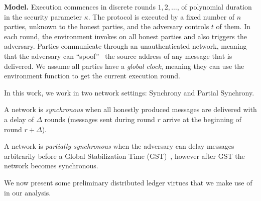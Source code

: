 \noindent
\textbf{Model.}
Execution commences in discrete rounds $1, 2, \ldots$, of polynomial duration in the
security parameter $\kappa$.
The protocol is executed by a fixed number of $n$ parties,
unknown to the honest parties, and the adversary controls $t$ of them. 
In each round, the environment invokes \execute
on all honest parties and also triggers the adversary.
Parties communicate through an unauthenticated network,
meaning that the adversary can ``spoof''~\cite{douceur2002sybil}
the source address of any message that is delivered.
We assume all parties have a \emph{global clock}, meaning
they can use the environment function \now to get the current
execution round.


In this work, we work in two network settings: Synchrony and Partial Synchrony.

\begin{definition}[Synchrony]
  A network is \emph{synchronous} when
  all honestly produced messages are delivered with a delay of $\Delta$ rounds
  (messages sent during round $r$ arrive at the beginning of round $r + \Delta$).
\end{definition}

\begin{definition}
  A network is \emph{partially synchronous} when the adversary can delay
  messages arbitrarily before a Global Stabilization Time (GST)~\cite{dwork1988consensus}, however
  after GST the network becomes synchronous.
\end{definition}

We now present some preliminary distributed ledger virtues
that we make use of in our analysis.

